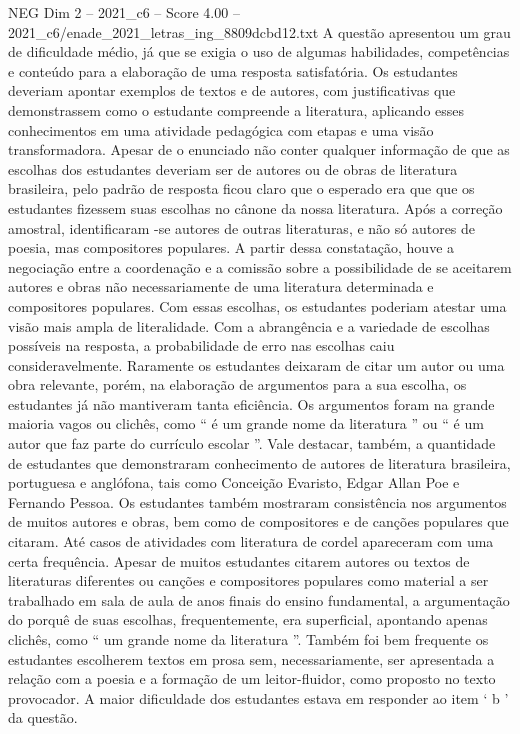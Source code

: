 \begin{textsample}{NEG Dim 2 – 2021\_c6 – Score 4.00 – 2021\_c6/enade\_2021\_letras\_ing\_8809dcbd12.txt}
A questão apresentou um grau de dificuldade médio, já que se exigia o uso de algumas habilidades, competências e conteúdo para a elaboração de uma resposta satisfatória.
Os estudantes deveriam apontar exemplos de textos e de autores, com justificativas que demonstrassem como o estudante compreende a literatura, aplicando esses conhecimentos em uma atividade pedagógica com etapas e uma visão transformadora.
Apesar de o enunciado não conter qualquer informação de que as escolhas dos estudantes deveriam ser de autores ou de obras de literatura brasileira, pelo padrão de resposta ficou claro que o esperado era que que os estudantes fizessem suas escolhas no cânone da nossa literatura.
Após a correção amostral, identificaram -se autores de outras literaturas, e não só autores de poesia, mas compositores populares.
A partir dessa constatação, houve a negociação entre a coordenação e a comissão sobre a possibilidade de se aceitarem autores e obras não necessariamente de uma literatura determinada e compositores populares.
Com essas escolhas, os estudantes poderiam atestar uma visão mais ampla de literalidade.
Com a abrangência e a variedade de escolhas possíveis na resposta, a probabilidade de erro nas escolhas caiu consideravelmente.
Raramente os estudantes deixaram de citar um autor ou uma obra relevante, porém, na elaboração de argumentos para a sua escolha, os estudantes já não mantiveram tanta eficiência.
Os argumentos foram na grande maioria vagos ou clichês, como “ é um grande nome da literatura ” ou “ é um autor que faz parte do currículo escolar ”.
Vale destacar, também, a quantidade de estudantes que demonstraram conhecimento de autores de literatura brasileira, portuguesa e anglófona, tais como Conceição Evaristo, Edgar Allan Poe e Fernando Pessoa.
Os estudantes também mostraram consistência nos argumentos de muitos autores e obras, bem como de compositores e de canções populares que citaram.
Até casos de atividades com literatura de cordel apareceram com uma certa frequência.
Apesar de muitos estudantes citarem autores ou textos de literaturas diferentes ou canções e compositores populares como material a ser trabalhado em sala de aula de anos finais do ensino fundamental, a argumentação do porquê de suas escolhas, frequentemente, era superficial, apontando apenas clichês, como “ um grande nome da literatura ”.
Também foi bem frequente os estudantes escolherem textos em prosa sem, necessariamente, ser apresentada a relação com a poesia e a formação de um leitor-fluidor, como proposto no texto provocador.
A maior dificuldade dos estudantes estava em responder ao item ‘ b ’ da questão.

\end{textsample}
